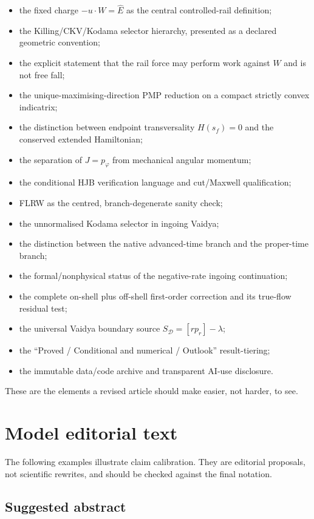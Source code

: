 \documentclass[11pt,a4paper]{article}
\begin{document}
\begin{itemize}
  \item the fixed charge $-u\cdot W=\hat E$ as the central controlled-rail definition;
  \item the Killing/CKV/Kodama selector hierarchy, presented as a declared geometric convention;
  \item the explicit statement that the rail force may perform work against $W$ and is not free
  fall;
  \item the unique-maximising-direction PMP reduction on a compact strictly convex indicatrix;
  \item the distinction between endpoint transversality $H(s_f)=0$ and the conserved extended
  Hamiltonian;
  \item the separation of $J=p_\varphi$ from mechanical angular momentum;
  \item the conditional HJB verification language and cut/Maxwell qualification;
  \item FLRW as the centred, branch-degenerate sanity check;
  \item the unnormalised Kodama selector in ingoing Vaidya;
  \item the distinction between the native advanced-time branch and the proper-time branch;
  \item the formal/nonphysical status of the negative-rate ingoing continuation;
  \item the complete on-shell plus off-shell first-order correction and its true-flow residual test;
  \item the universal Vaidya boundary source $S_{\mathcal D}=[r p_r]-\lambda$;
  \item the ``Proved / Conditional and numerical / Outlook'' result-tiering;
  \item the immutable data/code archive and transparent AI-use disclosure.
\end{itemize}

These are the elements a revised article should make easier, not harder, to see.

\section{Model editorial text}\label{sec:modeltext}

The following examples illustrate claim calibration.  They are editorial proposals, not
scientific rewrites, and should be checked against the final notation.

\subsection{Suggested abstract}
\end{document}
